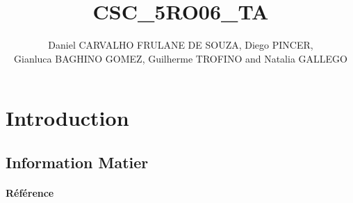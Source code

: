 \documentclass{article}
\title{CSC\_5RO06\_TA}
\author{Daniel CARVALHO FRULANE DE SOUZA, Diego PINCER,\\Gianluca BAGHINO GOMEZ, Guilherme TROFINO and Natalia GALLEGO}
\begin{document}
\maketitle

\newpage\tableofcontents

\section{Introduction}
\subsection{Information Matier}
\paragraph{Référence}






\end{document}
